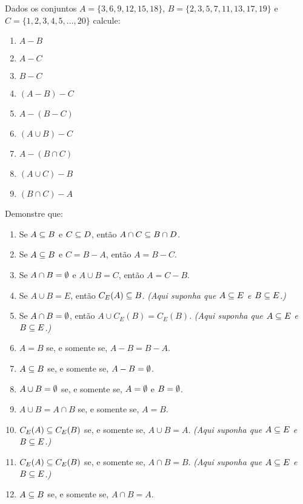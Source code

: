 \documentclass[12pt]{exam}
\begin{document}
\vspace{.3cm}

\questao Dados os conjuntos $A = \{3,6,9,12,15,18\}$, $B = \{2,3,5,7,11,13,17,19\}$ e $C = \{1,2,3,4,5,\dots,20\}$ calcule:
\begin{multicols}{3}
	\begin{enumerate}[label={\alph*})]
		\item $A - B$
		\item $A - C$
		\item $B - C$
		\item $(A - B) - C$
		\item $A - (B - C)$
		\item $(A \cup B) - C$
		\item $A - (B \cap C)$
		\item $(A \cup C) - B$
		\item $(B \cap C) - A$
	\end{enumerate}
\end{multicols}

\vspace{.3cm}

\questao Demonstre que:
\begin{enumerate}[label={\alph*})]
\item Se $A \subseteq B$ e $C \subseteq D$, ent\~ao $A \cap C \subseteq B \cap D$.

\item Se $A \subseteq B$ e $C = B - A$, ent\~ao $A = B - C$.

\item Se $A \cap B = \emptyset$ e $A \cup B = C$, ent\~ao $A = C - B$.

\item Se $A\cup B = E$, ent\~ao $C_E(A) \subseteq B$. \textit{(Aqui suponha que $A \subseteq E$ e $B \subseteq E$.)}

\item Se $A \cap B = \emptyset$, ent\~ao $A \cup C_E(B) = C_E(B)$. \textit{(Aqui suponha que $A \subseteq E$ e $B \subseteq E$.)}
  
\item $A = B$ se, e somente se, $A - B = B - A$.

\item $A \subseteq B$ se, e somente se, $A - B = \emptyset$.

\item $A \cup B = \emptyset$ se, e somente se, $A = \emptyset$ e $B = \emptyset$.

\item $A \cup B = A \cap B$ se, e somente se,  $A = B$.

\item $C_E(A) \subseteq C_E(B)$ se, e somente se, $A \cup B = A$. \textit{(Aqui suponha que $A \subseteq E$ e $B \subseteq E$.)}

\item $C_E(A) \subseteq C_E(B)$ se, e somente se, $A \cap B = B$. \textit{(Aqui suponha que $A \subseteq E$ e $B \subseteq E$.)}

\item $A \subseteq B$ se, e somente se,  $A \cap B = A$.
\end{enumerate}
\end{document}
